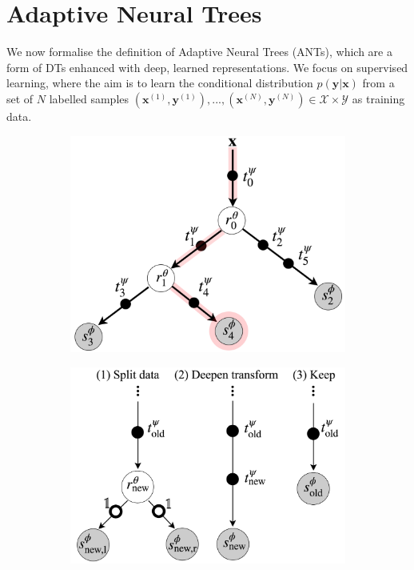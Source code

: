 \section{Adaptive Neural Trees}
We now formalise the definition of Adaptive Neural Trees (ANTs), which are a form of DTs enhanced with deep, learned representations. We focus on supervised learning, where the aim is to learn the conditional distribution $p(\mathbf{y}|\mathbf{x})$ from a set of $N$ labelled samples $(\mathbf{x}^{(1)}, \mathbf{y}^{(1)}), ..., (\mathbf{x}^{(N)}, \mathbf{y}^{(N)}) \in \mathcal{X} \times \mathcal{Y}$ as training data.

\begin{figure}[ht]
	\centering
	\begin{subfigure}[]{0.45\linewidth}
		\includegraphics[width=\linewidth]{chapter_7/figures/fig_4_3.png}
	\end{subfigure}
	\hspace{1mm}
	\begin{subfigure}[]{0.52\linewidth}
		\includegraphics[width=\linewidth]{chapter_7/figures/fig_5_6.png}

\end{subfigure}
\end{figure}
